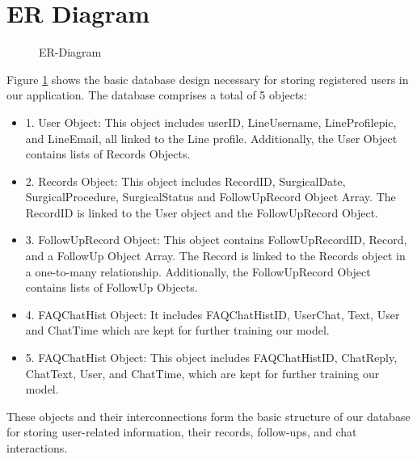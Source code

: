 \documentclass[12pt,oneside,openright,a4paper]{cpe-english-project}
\begin{document}
  \section{ER Diagram}
    \begin{figure}[!h]
      \centering
      \caption{ER-Diagram}\label{fig:ER}
    \end{figure}
    \qquad Figure \ref{fig:ER} shows the basic database design necessary for storing registered users in our application. The database comprises a total of 5 objects:\par
    \begin{itemize}
      \item[] 1. User Object: This object includes userID, LineUsername, LineProfilepic, and LineEmail, all linked to the Line profile. Additionally, the User Object contains lists of Records Objects.
      \item[] 2. Records Object: This object includes RecordID, SurgicalDate, SurgicalProcedure, SurgicalStatus and FollowUpRecord Object Array. The RecordID is linked to the User object and the FollowUpRecord Object.
      \item[] 3. FollowUpRecord Object: This object contains FollowUpRecordID, Record, and a FollowUp Object Array. The Record is linked to the Records object in a one-to-many relationship. Additionally, the FollowUpRecord Object contains lists of FollowUp Objects.
      \item[] 4. FAQChatHist Object: It includes FAQChatHistID, UserChat, Text, User and ChatTime which are kept for further training our model.
      \item[] 5. FAQChatHist Object: This object includes FAQChatHistID, ChatReply, ChatText, User, and ChatTime, which are kept for further training our model.
    \end{itemize}
    \qquad These objects and their interconnections form the basic structure of our database for storing user-related information, their records, follow-ups, and chat interactions. \par
\end{document}
